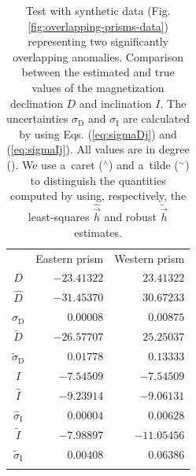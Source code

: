 \documentclass[journal abbreviation, npg]{copernicus}
\begin{document}
\begin{table}[t]
\caption{Test with synthetic data (Fig. \ref{fig:overlapping-prisms-data})
representing two significantly overlapping anomalies. Comparison between 
the estimated and
true values of the magnetization declination $D$ and inclination $I$. The
uncertainties $\sigma_\mathrm{D}$ and $\sigma_\mathrm{I}$ are calculated by
using Eqs. (\ref{eq:sigmaDj}) and (\ref{eq:sigmaIj}). All values are in
degree ({\degree}). We use a~caret ($^{\wedge}$) and a~tilde ($^{\sim}$) to
distinguish the quantities computed by using, respectively, the least-squares
$\hat{\vec{h}}$ and robust $\tilde{\vec{h}}$ estimates.}
\begin{tabular}{crr}
\tophline
&Eastern prism & Western prism \\
\middlehline
$D$ &$-23.41322$ &$23.41322$ \\
$\hat{D}$ &$-31.45370$ &$30.67233$ \\
$\hat{\sigma}_\mathrm{D}$ &$0.00008$ &$0.00875$  \\
$\tilde{D}$ &$-26.57707$ &$25.25037$ \\
$\tilde{\sigma}_\mathrm{D}$ &$0.01778$ &$0.13333$ \\
$I$ &$-7.54509$ &$-7.54509$ \\
$\hat{I}$ &$-9.23914$ &$-9.06131$  \\
$\hat{\sigma}_\mathrm{I}$ &$0.00004$ &$0.00628$  \\
$\tilde{I}$ &$-7.98897$ &$-11.05456$ \\
$\tilde{\sigma}_\mathrm{I}$ &$0.00408$ &$0.06386$ \\
\bottomhline
\end{tabular}
\label{tab:overlapping-prisms-results}
\end{table}
\end{document}
